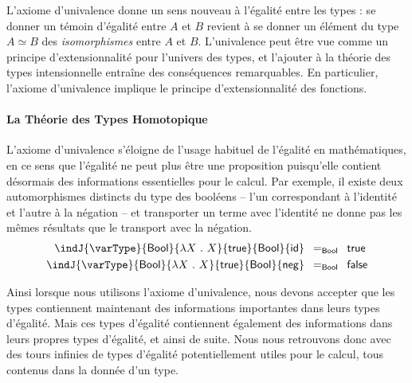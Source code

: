 L'axiome d'univalence donne un sens nouveau à l'égalité entre les types : 
% 
% 
se donner un témoin d'égalité entre \( A \) et \( B \) revient à se donner un 
élément du type \( A \simeq B \) des \emph{isomorphismes} entre \( A \) et \( B \). 
% 
L'univalence peut être vue comme un principe d'extensionnalité pour l'univers 
des types, et l'ajouter à la théorie des types intensionnelle entraîne des 
conséquences remarquables. 
% 
En particulier, l'axiome d'univalence implique le principe d'extensionnalité des 
fonctions.

\paragraph*{La Théorie des Types Homotopique}
% 
L'axiome d'univalence s'éloigne de l'usage habituel de l'égalité en mathématiques,
en ce sens que l'égalité ne peut plus être une proposition puisqu'elle contient 
désormais des informations essentielles pour le calcul.  
% 
Par exemple, il existe deux automorphismes distincts du type des booléens -- 
l'un correspondant à l'identité et l'autre à la négation -- et transporter un terme avec 
l'identité ne donne pas les mêmes résultats que le transport avec la négation.
% 
\[
\begin{split}
\indJ{\varType}{\mathsf{Bool}}{\lambda X\ .\ X}{\mathsf{true}}{\mathsf{Bool}}{\mathsf{id}} & \enskip =_{\mathsf{Bool}} \enskip \mathsf{true} \\
\indJ{\varType}{\mathsf{Bool}}{\lambda X\ .\ X}{\mathsf{true}}{\mathsf{Bool}}{\mathsf{neg}} & \enskip =_{\mathsf{Bool}} \enskip \mathsf{false}
\end{split}
\]

Ainsi lorsque nous utilisons l'axiome d'univalence, nous devons accepter que 
les types contiennent maintenant des informations importantes dans leurs types 
d'égalité. 
% 
Mais ces types d'égalité contiennent également des informations dans leurs 
propres types d'égalité, et ainsi de suite. 
% 
Nous nous retrouvons donc avec des tours infinies de types d'égalité 
potentiellement utiles pour le calcul, tous contenus dans la donnée d'un type.


